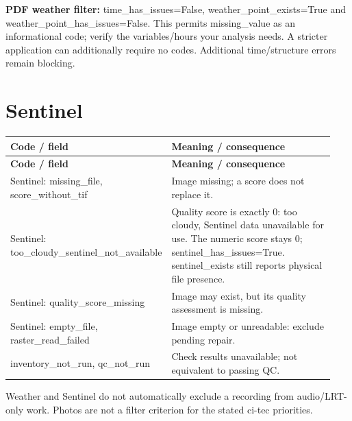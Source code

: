 \documentclass[a4paper,9pt]{extarticle}
\begin{document}
\textbf{PDF weather filter:} time\_has\_issues=False, weather\_point\_exists=True and weather\_point\_has\_issues=False. This permits missing\_value as an informational code; verify the variables/hours your analysis needs. A stricter application can additionally require no codes. Additional time/structure errors remain blocking.\par

\section*{Sentinel}

\begingroup\small\begin{longtable}{>{\raggedright\arraybackslash}p{0.39\linewidth}>{\raggedright\arraybackslash}p{0.55\linewidth}}

\rowcolor{navy} \color{white}\bfseries Code / field & \color{white}\bfseries Meaning / consequence \\

\endfirsthead

\rowcolor{navy} \color{white}\bfseries Code / field & \color{white}\bfseries Meaning / consequence \\

\endhead

\rowcolor{pale} Sentinel: missing\_file, score\_without\_tif & Image missing; a score does not replace it. \\

Sentinel: too\_cloudy\_sentinel\_not\_available & Quality score is exactly 0: too cloudy, Sentinel data unavailable for use. The numeric score stays 0; sentinel\_has\_issues=True. sentinel\_exists still reports physical file presence. \\

\rowcolor{pale} Sentinel: quality\_score\_missing & Image may exist, but its quality assessment is missing. \\

Sentinel: empty\_file, raster\_read\_failed & Image empty or unreadable: exclude pending repair. \\

\rowcolor{pale} inventory\_not\_run, qc\_not\_run & Check results unavailable; not equivalent to passing QC. \\

\end{longtable}\endgroup

Weather and Sentinel do not automatically exclude a recording from audio/LRT-only work. Photos are not a filter criterion for the stated ci-tec priorities.\par
\end{document}
